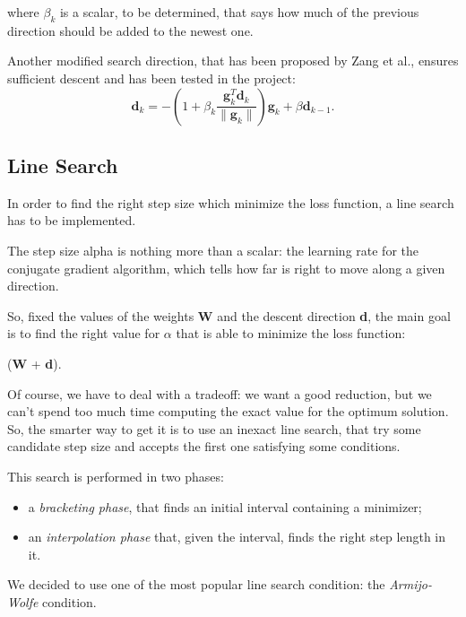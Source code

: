 		where $\beta_k$ is a scalar, to be determined, that says how much of the previous direction should be added to the newest one. 

		Another modified search direction, that has been proposed by Zang et al., ensures sufficient descent and has been tested in the project:
		\begin{equation}
		 \textbf{d}_{k} = -(1 + \beta_k\frac{\textbf{g}_k^T\textbf{d}_{k}}{\|\textbf{g}_k\|})\textbf{g}_k + \beta\textbf{d}_{k-1}.
		\end{equation}



		\subsection{Line Search} %
		\label{sub:line_search}

			In order to find the right step size which minimize the loss function, a line search has to be implemented.

			The step size alpha is nothing more than a scalar: the learning rate for the conjugate gradient algorithm, which tells how far is right to move along a given direction. 

			So, fixed the values of the weights \textbf{W} and the descent direction \textbf{d}, the main goal is to find the right value for $\alpha$ that is able to minimize the loss function:

			 \begin{mini} 
			   {\alpha}{(\textbf{W} + \alpha\textbf{d}).}{}{}
			    \end{mini}

			Of course, we have to deal with a tradeoff: we want a good reduction, but we can't spend too much time computing the exact value for the optimum solution. So, the smarter way to get it is to use an inexact line search, that try some candidate step size and accepts the first one satisfying some conditions.  

			This search is performed in two phases: 
			\begin{itemize}
			\item a \textit{bracketing phase}, that finds an initial interval containing a minimizer;
			\item an \textit{interpolation phase} that, given the interval, finds the right step length in it.
			\end{itemize}

			We decided to use one of the most popular line search condition: the \textit{Armijo-Wolfe} condition.

